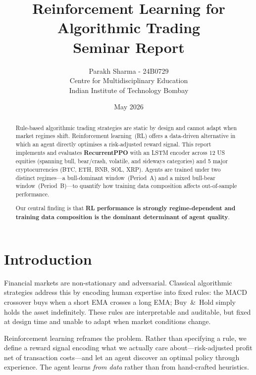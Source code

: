 \documentclass[12pt,a4paper]{article}
\title{%
  \textbf{Reinforcement Learning for Algorithmic Trading}\\[4pt]

  \normalsize Seminar Report
}
\author{Parakh Sharma - 24B0729 \\
  \small Centre for Multidisciplinary Education\\
  \small Indian Institute of Technology Bombay
}
\date{May 2026}
\begin{document}
\maketitle

\begin{abstract}
Rule-based algorithmic trading strategies are static by design and cannot
adapt when market regimes shift. Reinforcement learning~(RL) offers a
data-driven alternative in which an agent directly optimises a risk-adjusted
reward signal. This report implements and evaluates \textbf{RecurrentPPO}
with an LSTM encoder across 12 US equities (spanning bull, bear/crash,
volatile, and sideways categories) and 5 major cryptocurrencies (BTC, ETH,
BNB, SOL, XRP). Agents are trained under two distinct regimes---a
bull-dominant window~(Period~A) and a mixed bull-bear window~(Period~B)---to
quantify how training data composition affects out-of-sample performance.

Our central finding is that \textbf{RL performance is strongly
regime-dependent and training data composition is the dominant determinant
of agent quality}. 
\end{abstract}

\newpage\tableofcontents\newpage

\section{Introduction}

Financial markets are non-stationary and adversarial. Classical algorithmic
strategies address this by encoding human expertise into fixed rules: the
MACD crossover buys when a short EMA crosses a long EMA; Buy~\&~Hold
simply holds the asset indefinitely. These rules are interpretable and
auditable, but fixed at design time and unable to adapt when market
conditions change.

Reinforcement learning reframes the problem. Rather than specifying a rule,
we define a reward signal encoding what we actually care about---risk-adjusted
profit net of transaction costs---and let an agent discover an optimal policy
through experience. The agent learns \emph{from data} rather than from
hand-crafted heuristics.
\end{document}
